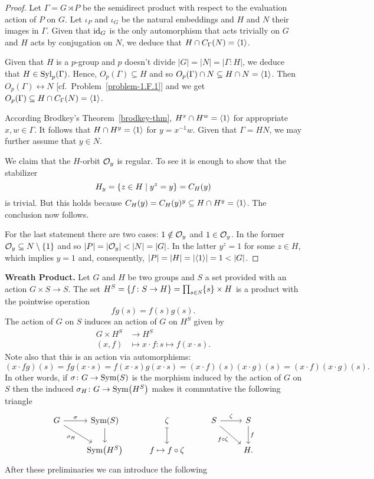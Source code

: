 \begin{proof} Let $\Gamma=G\rtimes P$ be the semidirect product with respect to the evaluation action of $P$ on $G$. Let $\iota_P$ and $\iota_G$ be the natural embeddings and $H$ and $N$ their images in $\Gamma$. Given that $\operatorname{id}_G$ is the only automorphism that acts trivially on $G$ and $H$ acts by conjugation on $N$, we deduce that $H\cap C_\Gamma(N)=\langle1\rangle$.

Given that $H$ is a $p$-group and $p$ doesn't divide $|G|=|N|=|\Gamma:H|$, we deduce that $H\in{\rm Syl}_p(\Gamma)$. Hence, $O_p(\Gamma)\subseteq H$ and so $O_p(\Gamma)\cap N\subseteq H\cap N=\langle1\rangle$. Then $O_p(\Gamma)\leftrightarrow N$ [cf.~Problem~\ref{problem-1.F.1}] and we get $O_p(\Gamma)\subseteq H\cap C_\Gamma(N)=\langle1\rangle$.

According Brodkey's Theorem~\ref{brodkey-thm}, $H^x\cap H^w=\langle1\rangle$ for appropriate $x,w\in\Gamma$. It follows that $H\cap H^y=\langle1\rangle$ for $y=x^{-1}w$. Given that $\Gamma=HN$, we may further assume that $y\in N$.

We claim that the $H$-orbit ${\cal O}_y$ is regular. To see it is enough to show that the stabilizer
$$
    H_y=\{z\in H\mid y^z=y\}=C_H(y)
$$
is trivial. But this holds because $C_H(y)=C_H(y)^y\subseteq H\cap H^y=\langle1\rangle$. The conclusion now follows.

For the last statement there are two cases: $1\notin{\cal O}_y$ and $1\in{\cal O}_y$. In the former ${\cal O}_y\subseteq N\setminus\{1\}$ and so $|P|=|{\cal O}_y|<|N|=|G|$. In the latter $y^z=1$ for some $z\in H$, which implies $y=1$ and, consequently, $|P|=|H|=|\gen1|=1<|G|$.  \end{proof}

\medskip

\textbf{Wreath Product.} Let $G$ and $H$ be two groups and $S$ a set provided with an action $G\times S\to S$. The set $H^S=\{f\colon S\to H\}=\prod_{s\in S}\{s\}\times H$ is a product with the pointwise operation 
$$
    fg(s)=f(s)g(s).
$$
The action of $G$ on $S$ induces an action of $G$ on $H^S$ given by
\begin{align*}
    G\times H^S&\to H^S\\
    (x,f)&\mapsto x\cdot f\colon s\mapsto f(x\cdot s).
\end{align*}
Note also that this is an action via automorphisms:
$$
    (x\cdot fg)(s) = fg(x\cdot s) = f(x\cdot s)g(x\cdot s)
        = (x\cdot f)(s)(x\cdot g)(s)=(x\cdot f)(x\cdot g)(s).
$$
In other words, if $\sigma\colon G\to{\rm Sym}(S)$ is the morphism induced by the action of $G$ on $S$ then the induced $\sigma_H\colon G\to{\rm Sym}\big(H^S\big)$ makes it commutative the following triangle
$$
    \begin{tikzcd}
        G \arrow[r, "\sigma"] \arrow[rd, "\sigma_H"']
            & \Sym(S) \arrow[d]
            & \zeta \arrow[d, maps to]
            & S \arrow[r, "\zeta"] \arrow[rd, "f\circ\zeta"']
            & S \arrow[d, "f"]
        \\& \Sym\big(H^S\big) & f\mapsto f\circ\zeta & & H.
    \end{tikzcd}
$$
After these preliminaries we can introduce the following

